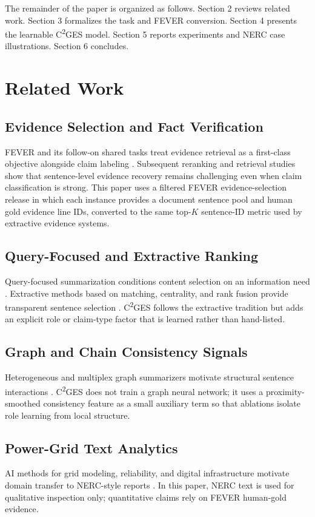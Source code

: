 \documentclass[cmc,article,submit,moreauthors,pdftex]{Definitions/tsp}
\newcommand{\cges}{C\textsuperscript{2}GES}
\begin{document}
The remainder of the paper is organized as follows. Section 2 reviews related work. Section 3 formalizes the task and FEVER conversion. Section 4 presents the learnable \cges{} model. Section 5 reports experiments and NERC case illustrations. Section 6 concludes.

\section{Related Work}
\label{sec:related_work}

\subsection{Evidence Selection and Fact Verification}
FEVER and its follow-on shared tasks treat evidence retrieval as a first-class objective alongside claim labeling \cite{thorne2018fever}. Subsequent reranking and retrieval studies show that sentence-level evidence recovery remains challenging even when claim classification is strong. This paper uses a filtered FEVER evidence-selection release in which each instance provides a document sentence pool and human gold evidence line IDs, converted to the same top-$K$ sentence-ID metric used by extractive evidence systems.

\subsection{Query-Focused and Extractive Ranking}
Query-focused summarization conditions content selection on an information need \cite{zhong2021qmsum,liu2023rank,sotudeh2024rank}. Extractive methods based on matching, centrality, and rank fusion provide transparent sentence selection \cite{zhong2020extractive,bi2021aredsum,khor2021text}. \cges{} follows the extractive tradition but adds an explicit role or claim-type factor that is learned rather than hand-listed.

\subsection{Graph and Chain Consistency Signals}
Heterogeneous and multiplex graph summarizers motivate structural sentence interactions \cite{wang2020heterogeneous,jing2021multiplex}. \cges{} does not train a graph neural network; it uses a proximity-smoothed consistency feature as a small auxiliary term so that ablations isolate role learning from local structure.

\subsection{Power-Grid Text Analytics}
AI methods for grid modeling, reliability, and digital infrastructure motivate domain transfer to NERC-style reports \cite{xie2022massively,srinivasan2023artificial,hamann2024foundation,madabhushi2023survey}. In this paper, NERC text is used for qualitative inspection only; quantitative claims rely on FEVER human-gold evidence.
\end{document}

